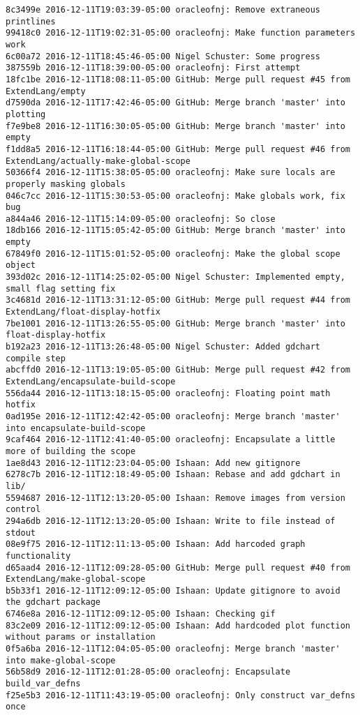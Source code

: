 \begin{lstlisting}
8c3499e 2016-12-11T19:03:39-05:00 oracleofnj: Remove extraneous printlines
99418c0 2016-12-11T19:02:31-05:00 oracleofnj: Make function parameters work
6c00a72 2016-12-11T18:45:46-05:00 Nigel Schuster: Some progress
387559b 2016-12-11T18:39:00-05:00 oracleofnj: First attempt
18fc1be 2016-12-11T18:08:11-05:00 GitHub: Merge pull request #45 from ExtendLang/empty
d7590da 2016-12-11T17:42:46-05:00 GitHub: Merge branch 'master' into plotting
f7e9be8 2016-12-11T16:30:05-05:00 GitHub: Merge branch 'master' into empty
f1dd8a5 2016-12-11T16:18:44-05:00 GitHub: Merge pull request #46 from ExtendLang/actually-make-global-scope
50366f4 2016-12-11T15:38:05-05:00 oracleofnj: Make sure locals are properly masking globals
046c7cc 2016-12-11T15:30:53-05:00 oracleofnj: Make globals work, fix bug
a844a46 2016-12-11T15:14:09-05:00 oracleofnj: So close
18db166 2016-12-11T15:05:42-05:00 GitHub: Merge branch 'master' into empty
67849f0 2016-12-11T15:01:52-05:00 oracleofnj: Make the global scope object
393d02c 2016-12-11T14:25:02-05:00 Nigel Schuster: Implemented empty, small flag setting fix
3c4681d 2016-12-11T13:31:12-05:00 GitHub: Merge pull request #44 from ExtendLang/float-display-hotfix
7be1001 2016-12-11T13:26:55-05:00 GitHub: Merge branch 'master' into float-display-hotfix
b192a23 2016-12-11T13:26:48-05:00 Nigel Schuster: Added gdchart compile step
abcffd0 2016-12-11T13:19:05-05:00 GitHub: Merge pull request #42 from ExtendLang/encapsulate-build-scope
556da44 2016-12-11T13:18:15-05:00 oracleofnj: Floating point math hotfix
0ad195e 2016-12-11T12:42:42-05:00 oracleofnj: Merge branch 'master' into encapsulate-build-scope
9caf464 2016-12-11T12:41:40-05:00 oracleofnj: Encapsulate a little more of building the scope
1ae8d43 2016-12-11T12:23:04-05:00 Ishaan: Add new gitignore
6278c7b 2016-12-11T12:18:49-05:00 Ishaan: Rebase and add gdchart in lib/
5594687 2016-12-11T12:13:20-05:00 Ishaan: Remove images from version control
294a6db 2016-12-11T12:13:20-05:00 Ishaan: Write to file instead of stdout
08e9f75 2016-12-11T12:11:13-05:00 Ishaan: Add harcoded graph functionality
d65aad4 2016-12-11T12:09:28-05:00 GitHub: Merge pull request #40 from ExtendLang/make-global-scope
b5b33f1 2016-12-11T12:09:12-05:00 Ishaan: Update gitignore to avoid the gdchart package
6746e8a 2016-12-11T12:09:12-05:00 Ishaan: Checking gif
83c2e09 2016-12-11T12:09:12-05:00 Ishaan: Add hardcoded plot function without params or installation
0f5a6ba 2016-12-11T12:04:05-05:00 oracleofnj: Merge branch 'master' into make-global-scope
56b58d9 2016-12-11T12:01:28-05:00 oracleofnj: Encapsulate build_var_defns
f25e5b3 2016-12-11T11:43:19-05:00 oracleofnj: Only construct var_defns once

\end{lstlisting}
